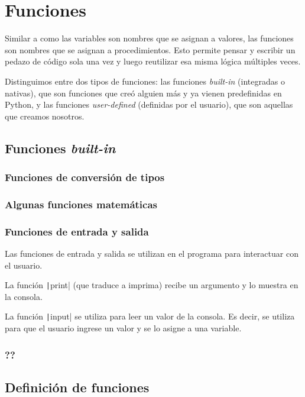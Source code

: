 \section{Funciones}

Similar a como las variables son nombres que se asignan a valores, las funciones son nombres que se asignan a procedimientos. Esto permite pensar y escribir un pedazo de código sola una vez y luego reutilizar esa misma lógica múltiples veces.

Distinguimos entre dos tipos de funciones: las funciones \emph{\textit{built-in}} (integradas o nativas), que son funciones que creó alguien más y ya vienen predefinidas en Python, y las funciones \emph{\textit{user-defined}} (definidas por el usuario), que son aquellas que creamos nosotros.

\subsection{Funciones \textit{built-in}}

\subsubsection{Funciones de conversión de tipos}


\subsubsection{Algunas funciones matemáticas}


\subsubsection{Funciones de entrada y salida}

Las funciones de entrada y salida se utilizan en el programa para interactuar con el usuario.

La función \texttt|print| (que traduce a imprima) recibe un argumento y lo muestra en la consola.

La función \texttt|input| se utiliza para leer un valor de la consola. Es decir, se utiliza para que el usuario ingrese un valor y se lo asigne a una variable.

\subsubsection{??}  %


\subsection{Definición de funciones}


